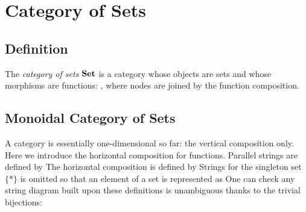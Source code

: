 \section{Category of Sets}

\subsection{Definition}

The \textit{category of sets} $\boldsymbol{\mathrm{Set}}$ is a category whose objects are sets and whose morphisms are functions:
, where nodes are joined by the function composition. 


\subsection{Monoidal Category of Sets}

A category is essentially one-dimensional so far: the vertical composition only. %
Here we introduce the horizontal composition for functions. Parallel strings are defined by
The horizontal composition is defined by
Strings for the singleton set $\lbrace \ast\rbrace$ is omitted so that an element of a set is represented as
One can check any string diagram built upon these definitions is unambiguous thanks to the trivial bijections:



